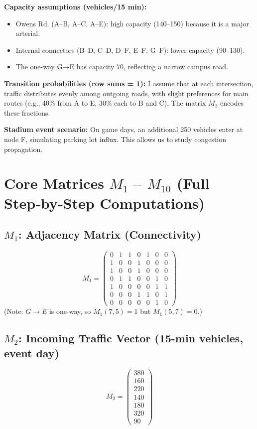 \documentclass{ximera}
\begin{document}
\noindent \textbf{Capacity assumptions (vehicles/15 min):}
\begin{itemize}
    \item Owens Rd. (A–B, A–C, A–E): high capacity (140–150) because it is a major arterial.
    \item Internal connectors (B–D, C–D, D–F, E–F, G–F): lower capacity (90–130).
    \item The one-way G→E has capacity 70, reflecting a narrow campus road.
\end{itemize}

\noindent \textbf{Transition probabilities (row sums = 1):}
I assume that at each intersection, traffic distributes evenly among outgoing roads, with slight preferences for main routes (e.g., 40\% from A to E, 30\% each to B and C). The matrix \(M_3\) encodes these fractions.

\noindent \textbf{Stadium event scenario:} On game days, an additional 250 vehicles enter at node F, simulating parking lot influx. This allows us to study congestion propagation.

\newpage

\section*{Core Matrices \texorpdfstring{\(M_1\)}{M1} – \texorpdfstring{\(M_{10}\)}{M10} (Full Step‑by‑Step Computations)}

\subsection*{\texorpdfstring{\(M_1\)}{M1}: Adjacency Matrix (Connectivity)}
\[
M_1 = \begin{pmatrix}
0 & 1 & 1 & 0 & 1 & 0 & 0\\
1 & 0 & 0 & 1 & 0 & 0 & 0\\
1 & 0 & 0 & 1 & 0 & 0 & 0\\
0 & 1 & 1 & 0 & 0 & 1 & 0\\
1 & 0 & 0 & 0 & 0 & 1 & 1\\
0 & 0 & 0 & 1 & 1 & 0 & 1\\
0 & 0 & 0 & 0 & 0 & 1 & 0
\end{pmatrix}
\]
(Note: \(G\rightarrow E\) is one-way, so \(M_1(7,5)=1\) but \(M_1(5,7)=0\).)

\subsection*{\texorpdfstring{\(M_2\)}{M2}: Incoming Traffic Vector (15-min vehicles, event day)}
\[
M_2 = \begin{pmatrix} 380 \\ 160 \\ 220 \\ 140 \\ 180 \\ 320 \\ 90 \end{pmatrix}
\]
\end{document}
